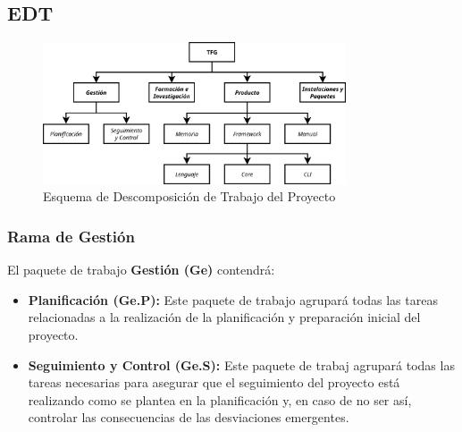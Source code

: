 








\subsection{EDT}\label{subsec:edt}

\begin{figure}[H]
    \centering
    \includegraphics[width=0.8\textwidth]{5-Cuerpo/Chapter2/EDT.png}
    \caption[EDT del Proyecto]{Esquema de Descomposición de Trabajo del Proyecto}
    \label{fig:EDT}
\end{figure}

\subsubsection{Rama de Gestión}
El paquete de trabajo \textbf{Gestión (Ge)} contendrá:
\begin{itemize}
    \item \textbf{Planificación (Ge.P):} Este paquete de trabajo agrupará todas
    las tareas relacionadas a la realización de la planificación y preparación
    inicial del proyecto.
    \item \textbf{Seguimiento y Control (Ge.S):} Este paquete de trabaj agrupará
    todas las tareas necesarias para asegurar que el seguimiento del proyecto
    está realizando como se plantea en la planificación y, en caso de no ser
    así, controlar las consecuencias de las desviaciones emergentes.
\end{itemize}

